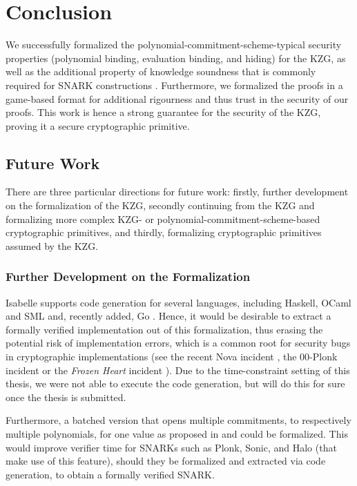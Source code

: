 \chapter{Conclusion}\label{chapter:conclusion}
We successfully formalized the polynomial-commitment-scheme-typical security properties (polynomial binding, evaluation binding, and hiding) for the KZG, as well as the additional property of knowledge soundness that is commonly required for SNARK constructions \parencite{thalerbook,plonk,sonic,halo}. Furthermore, we formalized the proofs in a game-based format for additional rigourness and thus trust in the security of our proofs.
This work is hence a strong guarantee for the security of the KZG, proving it a secure cryptographic primitive.

\section{Future Work}
There are three particular directions for future work: firstly, further development on the formalization of the KZG, secondly continuing from the KZG and formalizing more complex KZG- or polynomial-commitment-scheme-based cryptographic primitives, and thirdly, formalizing cryptographic primitives assumed by the KZG.

\subsection*{Further Development on the Formalization}
Isabelle supports code generation for several languages, including Haskell, OCaml and SML \parencite{code_gen} and, recently added, Go \parencite{go_codegen}. Hence, it would be desirable to extract a formally verified implementation out of this formalization, thus erasing the potential risk of implementation errors, which is a common root for security bugs in cryptographic implementations (see the recent Nova incident \parencite{nova_bug}, the 00-Plonk incident \parencite{00Plonk} or the \textit{Frozen Heart} incident \parencite{FHPlonk}). Due to the time-constraint setting of this thesis, we were not able to execute the code generation, but will do this for sure once the thesis is submitted.

Furthermore, a batched version that opens multiple commitments, to respectively multiple polynomials, for one value as proposed in \parencite{plonk} and \parencite{sonic} could be formalized. This would improve verifier time for SNARKs such as Plonk, Sonic, and Halo (that make use of this feature), should they be formalized and extracted via code generation, to obtain a formally verified SNARK.

